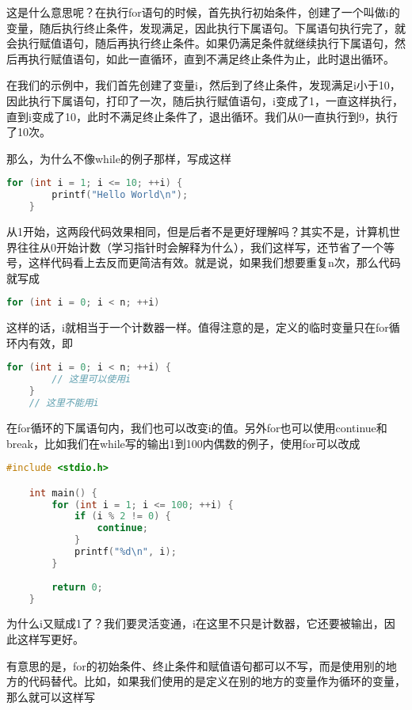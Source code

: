 这是什么意思呢？在执行for语句的时候，首先执行初始条件，创建了一个叫做i的变量，随后执行终止条件，发现满足，因此执行下属语句。下属语句执行完了，就会执行赋值语句，随后再执行终止条件。如果仍满足条件就继续执行下属语句，然后再执行赋值语句，如此一直循环，直到不满足终止条件为止，此时退出循环。

在我们的示例中，我们首先创建了变量i，然后到了终止条件，发现满足i小于10，因此执行下属语句，打印了一次，随后执行赋值语句，i变成了1，一直这样执行，直到i变成了10，此时不满足终止条件了，退出循环。我们从0一直执行到9，执行了10次。

那么，为什么不像while的例子那样，写成这样

\begin{lstlisting}[language=C]
    for (int i = 1; i <= 10; ++i) {
        printf("Hello World\n");
    }
\end{lstlisting}

从1开始，这两段代码效果相同，但是后者不是更好理解吗？其实不是，计算机世界往往从0开始计数（学习指针时会解释为什么），我们这样写，还节省了一个等号，这样代码看上去反而更简洁有效。就是说，如果我们想要重复n次，那么代码就写成

\begin{lstlisting}[language=C]
    for (int i = 0; i < n; ++i)
\end{lstlisting}

这样的话，i就相当于一个计数器一样。值得注意的是，定义的临时变量只在for循环内有效，即

\begin{lstlisting}[language=C]
    for (int i = 0; i < n; ++i) {
        // 这里可以使用i
    }
    // 这里不能用i
\end{lstlisting}

在for循环的下属语句内，我们也可以改变i的值。另外for也可以使用continue和break，比如我们在while写的输出1到100内偶数的例子，使用for可以改成

\begin{lstlisting}[language=C]
    #include <stdio.h>

    int main() {
        for (int i = 1; i <= 100; ++i) {
            if (i % 2 != 0) {
                continue;
            }
            printf("%d\n", i);
        }
        
        return 0;
    }
\end{lstlisting}

为什么i又赋成1了？我们要灵活变通，i在这里不只是计数器，它还要被输出，因此这样写更好。

有意思的是，for的初始条件、终止条件和赋值语句都可以不写，而是使用别的地方的代码替代。比如，如果我们使用的是定义在别的地方的变量作为循环的变量，那么就可以这样写

